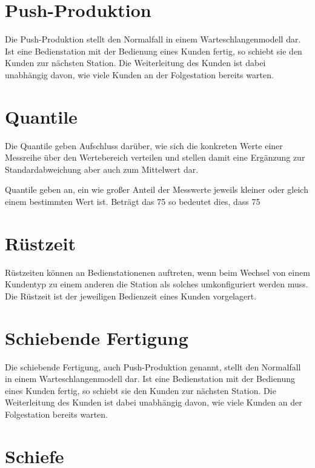 \section*{Push-Produktion}


Die Push-Produktion stellt den Normalfall in einem Warteschlangenmodell dar. Ist eine Bedienstation
mit der Bedienung eines Kunden fertig, so schiebt sie den Kunden zur nächsten Station. Die Weiterleitung
des Kunden ist dabei unabhängig davon, wie viele Kunden an der Folgestation bereits warten.

\section*{Quantile}


Die Quantile geben Aufschluss darüber, wie sich die konkreten Werte einer
Messreihe über den Wertebereich verteilen und stellen damit eine Ergänzung
zur Standardabweichung aber
auch zum Mittelwert dar.


Quantile geben an, ein wie großer Anteil der Messwerte jeweils kleiner oder gleich
einem bestimmten Wert ist. Beträgt das 75%
so bedeutet dies, dass 75%

\section*{Rüstzeit}


Rüstzeiten können an Bedienstationenen auftreten, wenn beim Wechsel
von einem Kundentyp zu einem anderen die Station als solches umkonfiguriert werden muss. Die Rüstzeit ist
der jeweiligen Bedienzeit eines Kunden vorgelagert.

\section*{Schiebende Fertigung}


Die schiebende Fertigung, auch Push-Produktion genannt, stellt den Normalfall in einem Warteschlangenmodell dar.
Ist eine Bedienstation mit der Bedienung eines Kunden fertig, so schiebt sie den Kunden zur nächsten Station.
Die Weiterleitung des Kunden ist dabei unabhängig davon, wie viele Kunden an der Folgestation bereits warten.

\section*{Schiefe}


